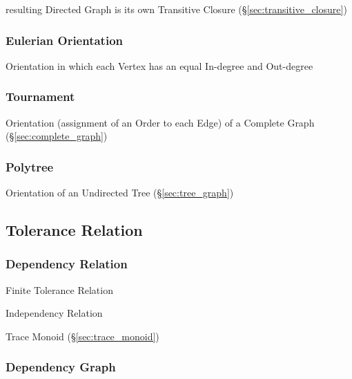 resulting Directed Graph is its own Transitive Closure
(\S\ref{sec:transitive_closure})



\subsubsection{Eulerian Orientation}\label{sec:eulerian_orientation}

Orientation in which each Vertex has an equal In-degree and Out-degree



\subsubsection{Tournament}\label{sec:tournament}

Orientation (assignment of an Order to each Edge) of a Complete Graph
(\S\ref{sec:complete_graph})



\subsubsection{Polytree}\label{sec:polytree}

Orientation of an Undirected Tree (\S\ref{sec:tree_graph})



\subsection{Tolerance Relation}\label{sec:tolerance_relation}


\subsubsection{Dependency Relation}\label{sec:dependency_relation}

Finite Tolerance Relation

Independency Relation

Trace Monoid (\S\ref{sec:trace_monoid})



\subsubsection{Dependency Graph}\label{sec:dependency_graph}

